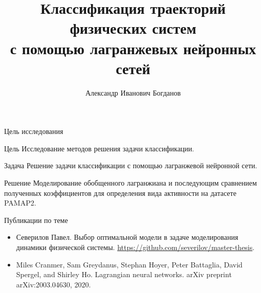 \documentclass{beamer}
\title[\hbox to 56mm{Классификация траекторий физических систем}]{Классификация траекторий физических систем\\ с помощью лагранжевых нейронных сетей}
\author[А.\,И.~Богданов]{Александр Иванович Богданов}
\institute{Московский физико-технический институт}
\date{\footnotesize
\par\smallskip\emph{Курс:} Моя первая научная статья
\par\smallskip\emph{Эксперт:} В.\,В.~Стрижов
\par\smallskip\emph{Консультант:} С.\,К.~Панченко
\par\bigskip\small 2023}
\begin{document}

\begin{frame}

    \thispagestyle{empty}
    \maketitle
    
\end{frame}


\begin{frame}{Цель исследования}
    \begin{block}{Цель}
        Исследование методов решения задачи классификации.
    \end{block}
    \begin{block}{Задача}
        Решение задачи классификации с помощью лагранжевой нейронной сети.
    \end{block}
    \begin{block}{Решение}
        Моделирование обобщенного лагранжиана и последующим сравнением полученных коэффициентов для определения вида активности на датасете PAMAP2.
    \end{block}
\end{frame}


\begin{frame}{Публикации по теме}
    \begin{itemize}
    
    \item Северилов Павел. Выбор оптимальной модели в задаче моделирования динамики физической системы. \url{https://github.com/severilov/master-thesis}.

    \item Miles Cranmer, Sam Greydanus, Stephan Hoyer, Peter Battaglia, David Spergel, and Shirley Ho. Lagrangian neural networks. arXiv preprint arXiv:2003.04630, 2020.
  
    \end{itemize}
\end{frame}

\end{document}
